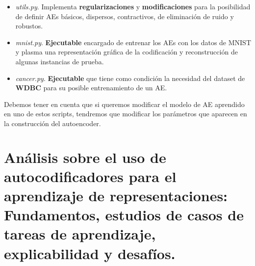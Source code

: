 \begin{enumerate}
\begin{enumerate}
\begin{itemize}
            \item \textit{utils.py}. Implementa \textbf{regularizaciones} y \textbf{modificaciones} para la posibilidad de definir AEs básicos, dispersos, contractivos, de eliminación de ruido y robustos.
            
            \newpage
            \item \textit{mnist.py}. \textbf{Ejecutable} encargado de entrenar los AEs con los datos de MNIST y plasma una representación gráfica de la codificación y reconstrucción de algunas instancias de prueba.
            
            \item \textit{cancer.py}. \textbf{Ejecutable} que tiene como condición la necesidad del dataset de \textbf{WDBC} para su posible entrenamiento de un AE.
            
        \end{itemize}
        
        Debemos tener en cuenta que si queremos modificar el modelo de AE aprendido en uno de estos scripts, tendremos que modificar los parámetros que aparecen en la construcción del autoencoder.
        
        
    \end{enumerate}
    
    
\end{enumerate}

\newpage
\section{Análisis sobre el uso de autocodificadores para el aprendizaje de representaciones: Fundamentos, estudios de casos de tareas de aprendizaje, explicabilidad y desafíos.}

